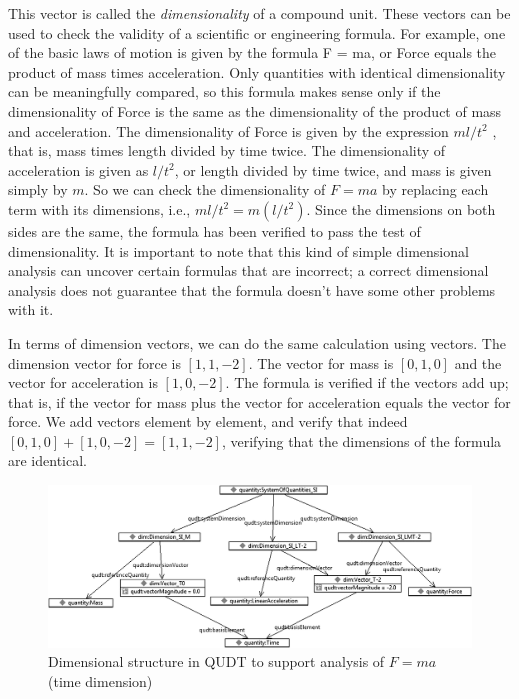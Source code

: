 This vector is called the \emph{dimensionality} of a compound unit. These
vectors can be used to check the validity of a scientific or engineering
formula. For example, one of the basic laws of motion is given by the
formula F = ma, or Force equals the product of mass times acceleration.
Only quantities with identical dimensionality can be meaningfully
compared, so this formula makes sense only if the dimensionality of
Force is the same as the dimensionality of the product of mass and
acceleration. The dimensionality of Force is given by the expression
$ml/{t^2}$ , that is, mass times length divided by time twice. The
dimensionality of acceleration is given as $l/{t^2}$, or length divided by
time twice, and mass is given simply by $m$. So we can check the
dimensionality of $F = ma$ by replacing each term with its dimensions,
i.e., ${ml}/{t^2} = m(l/{t^2})$. Since the dimensions on both sides are the
same, the formula has been verified to pass the test of dimensionality.
It is important to note that this kind of simple dimensional analysis
can uncover certain formulas that are incorrect; a correct dimensional
analysis does not guarantee that the formula doesn't have some other
problems with it.

In terms of dimension vectors, we can do the same calculation using
vectors. The dimension vector for force is $[1, 1, -2]$. The vector
for mass is $[0, 1, 0]$ and the vector for acceleration is $[1, 0,
-2]$. The formula is verified if the vectors add up; that is, if the
vector for mass plus the vector for acceleration
equals the vector for force. We add vectors element by element, and
verify that indeed $[0, 1, 0] + [1, 0, -2] = [1, 1, -2]$, verifying that the dimensions of the
formula are identical.


\begin{figure}
\centering
\includegraphics[width=5in]{media/ch14/f14-04.png}
\caption{Dimensional structure in QUDT to support analysis of $F=ma$ (time
dimension)}
\label{fig:ch14.04}
\end{figure}






